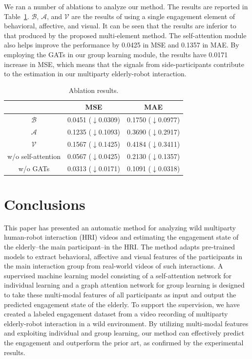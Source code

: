 \documentclass[VANCOUVER,STIX1COL]{WileyNJD-v2}
\begin{document}
We ran a number of ablations to analyze our method. The results are reported in Table~\ref{t:ablations}. $\mathcal{B}$, $\mathcal{A}$, and $\mathcal{V}$ are the results of using a single engagement element of behavioral, affective, and visual. It can be seen that the results are inferior to that produced by the proposed multi-element method. The self-attention module also helps improve the performance by 0.0425 in MSE and 0.1357 in MAE. By employing the GATs in our group learning module, the results have 0.0171 increase in MSE, which means that the signals from side-participants contribute to the estimation in our multiparty elderly-robot interaction.

\begin{table}[ht]
  \centering
  \caption{Ablation results.}
  \label{t:ablations}
  \begin{tabular}{ccc}
  \toprule
  \textbf{} & \textbf{MSE} & \textbf{MAE} \\
  \midrule
  $\mathcal{B}$ & 0.0451 ($\downarrow$0.0309) & 0.1750 ($\downarrow$0.0977) \\
  $\mathcal{A}$ & 0.1235 ($\downarrow$0.1093) & 0.3690 ($\downarrow$0.2917) \\
  $\mathcal{V}$ & 0.1567 ($\downarrow$0.1425) & 0.4184 ($\downarrow$0.3411) \\
  w/o self-attention & 0.0567 ($\downarrow$0.0425) & 0.2130 ($\downarrow$0.1357) \\
  w/o GATs & 0.0313 ($\downarrow$0.0171) & 0.1091 ($\downarrow$0.0318) \\
  \bottomrule
  \end{tabular}
\end{table}

\section{Conclusions}
\label{s:Conclusions}
This paper has presented an automatic method for analyzing wild multiparty human-robot interaction (HRI) videos and estimating the engagement state of the elderly--the main participant--in the HRI. The method adapts pre-trained models to extract behavioral, affective and visual features of the participants in the main interaction group from real-world videos of such interactions. A supervised machine learning model consisting of a self-attention network for individual learning and a graph attention network for group learning is designed to take these multi-modal features of all participants as input and output the predicted engagement state of the elderly. To support the supervision, we have created a labeled engagement dataset from a video recording of multiparty elderly-robot interaction in a wild environment. By utilizing multi-modal features and exploiting individual and group learning, our method can effectively predict the engagement and outperform the prior art, as confirmed by the experimental results.
\end{document}
